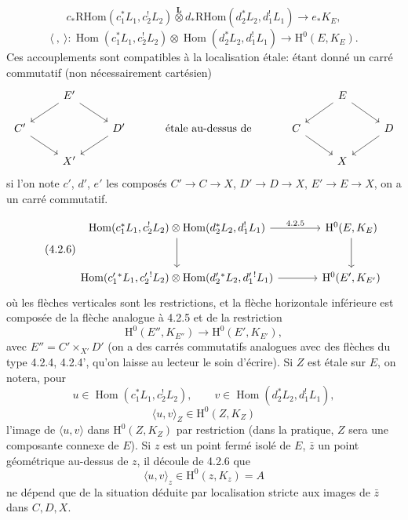 \documentclass[11pt]{article}
\renewcommand{\H}{\mathrm{H}}
\DeclareMathOperator{\Hom}{Hom}
\providecommand{\RHom}{\mathrm{RHom}}
\providecommand{\RHom}{\mathrm{RHom}}
\providecommand{\Hom}{\operatorname{Hom}}
\providecommand{\RHom}{\mathrm R\mathcal{H}om}
\providecommand{\RHom}{\mathrm{RHom}}
\providecommand{\Hom}{\operatorname{Hom}}
\begin{document}
\begin{equation}
c_*\RHom(c_1^*L_1,c_2^!L_2)\overset{\mathbf L}{\otimes}
 d_*\RHom(d_2^*L_2,d_1^!L_1)
\longrightarrow e_*K_E,
\tag{4.2.4'}
\end{equation}
\begin{equation}
\langle\ ,\ \rangle:
\Hom(c_1^*L_1,c_2^!L_2)\otimes\Hom(d_2^*L_2,d_1^!L_1)
\longrightarrow \H^0(E,K_E).
\tag{4.2.5}
\end{equation}
Ces accouplements sont compatibles à la localisation étale: étant donné un carré commutatif (non nécessairement cartésien)
\[
\begin{tikzcd}[column sep=2.5em,row sep=1.5em]
& E' \arrow[dl] \arrow[dr] & && & E \arrow[dl] \arrow[dr] & \\
C' \arrow[dr] && D' \arrow[dl] & \text{ étale au-dessus de } & C \arrow[dr] && D \arrow[dl] \\
& X' &&&& X &
\end{tikzcd}
\]
si l'on note $c'$, $d'$, $e'$ les composés $C'\to C\to X$, $D'\to D\to X$, $E'\to E\to X$, on a un carré commutatif.


\begin{equation}
\tag{4.2.6}
\begin{tikzcd}[column sep=large,row sep=large]
\Hom(c_1^*L_1,c_2^!L_2)\otimes\Hom(d_2^*L_2,d_1^!L_1)
  \arrow[r,"4.2.5"] \arrow[d] &
\H^0(E,K_E)\arrow[d] \\
\Hom(c_1'{}^*L_1,c_2'{}^!L_2)\otimes\Hom(d_2'{}^*L_2,d_1'{}^!L_1)
  \arrow[r] &
\H^0(E',K_{E'})
\end{tikzcd}
\end{equation}
où les flèches verticales sont les restrictions, et la flèche horizontale inférieure est composée de la flèche analogue à 4.2.5 et de la restriction
\[
\H^0(E'',K_{E''})\longrightarrow \H^0(E',K_{E'}),
\]
avec $E''=C'\times_{X'}D'$ (on a des carrés commutatifs analogues avec des flèches du type 4.2.4, 4.2.4', qu'on laisse au lecteur le soin d'écrire). Si $Z$ est étale sur $E$, on notera, pour
\[
u\in\Hom(c_1^*L_1,c_2^!L_2),\qquad
v\in\Hom(d_2^*L_2,d_1^!L_1),
\]
\begin{equation}
\tag{4.2.7}
\langle u,v\rangle_Z\in \H^0(Z,K_Z)
\end{equation}
l'image de $\langle u,v\rangle$ dans $\H^0(Z,K_Z)$ par restriction (dans la pratique, $Z$ sera une composante connexe de $E$). Si $z$ est un point fermé isolé de $E$, $\bar z$ un point géométrique au-dessus de $z$, il découle de 4.2.6 que
\[
\langle u,v\rangle_z\in \H^0(z,K_z)=A
\]
ne dépend que de la situation déduite par localisation stricte aux images de $\bar z$ dans $C,D,X$.
\end{document}
